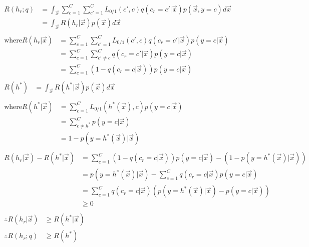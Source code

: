 \documentclass{introtosml}
\newcommand{\x}{\vec{x}}
\newcommand{\q}{q(c_r = c' | \x)}
\newcommand{\qc}{q(c_r = c | \x)}
\newcommand{\pyx}[1]{p(y = #1 | \x)}
\newcommand{\pyxh}{\pyx{h^*(\x)}}
\newcommand{\pyxc}{\pyx{c}}
\newcommand{\intx}[1]{\int_\vec{x} #1 d\vec{x}}
\newcommand{\R}[1]{R(#1 | \vec{x})}
\begin{document}
\maketitle

\begin{p}
  \item
    \begin{gather*}
      \begin{aligned}
        R(h_r; q)
        & = \intx{\sum_{c=1}^C \sum_{c'=1}^C L_{0/1}(c', c) \q p(\vec{x}, y = c)} \\
        & = \intx{\R{h_r} p(\vec{x})}
      \end{aligned} \\
      \begin{aligned}
        \text{where} \R{h_r}
        & = \sum_{c=1}^C \sum_{c'=1}^C L_{0/1} (c', c) \q \pyxc \\
        & = \sum_{c=1}^C \sum_{c' \ne c}^C \q \pyxc \\
        & = \sum_{c=1}^C (1 - \qc) \pyxc
      \end{aligned} \\
      \begin{aligned}
        R(h^*) & = \intx{\R{h^*} p(\vec{x})}
      \end{aligned} \\
      \begin{aligned}
        \text{where} \R{h^*}
        & = \sum_{c=1}^C L_{0/1} (h^*(\vec{x}), c) \pyxc \\
        & = \sum_{c \ne h^*}^C \pyxc \\
        & = 1 - \pyxh
      \end{aligned} \\
      \begin{aligned}
        \R{h_r} - \R{h^*}
        & = \sum_{c=1}^C (1 - \qc) \pyxc - (1 - \pyxh) \\
        & = \pyxh - \sum_{c=1}^C \qc \pyxc \\
        & = \sum_{c=1}^C \qc (\pyxh - \pyxc) \\
        & \ge 0
      \end{aligned} \\
      \begin{aligned}
        \therefore \R{h_r} & \ge \R{h^*} \\
        \therefore R(h_r; q) & \ge R(h^*)
      \end{aligned} \\
    \end{gather*}


\end{p}
\end{document}
